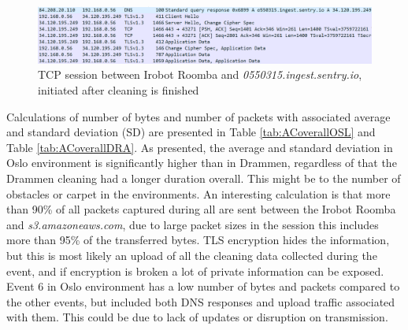 \begin{figure}[H]
    \centering
    \includegraphics[width=\textwidth]{figures/irobot_AC_DNSimgset.png}
    \caption{TCP session between Irobot Roomba and \textit{0550315.ingest.sentry.io}, initiated after cleaning is finished}
    \label{fig:AC_DNS_ingest}
\end{figure}


Calculations of number of bytes and  number of packets with associated average and standard deviation (SD) are presented in Table \ref{tab:ACoverallOSL} and Table \ref{tab:ACoverallDRA}. As presented, the average and standard deviation in Oslo environment is significantly higher than in Drammen, regardless of that the Drammen cleaning had a longer duration overall. This might be to the number of obstacles or carpet in the environments. An interesting calculation is that more than 90\% of all packets captured during all are sent between the Irobot Roomba and \textit{s3.amazoneaws.com}, due to large packet sizes in the session this includes more than 95\% of the transferred bytes. TLS encryption hides the information, but this is most likely an upload of all the cleaning data collected during the event, and if encryption is broken a lot of private information can be exposed. Event 6 in Oslo environment has a low number of bytes and packets compared to the other events, but included both DNS responses and upload traffic associated with them. This could be due to lack of updates or disruption on transmission. 


